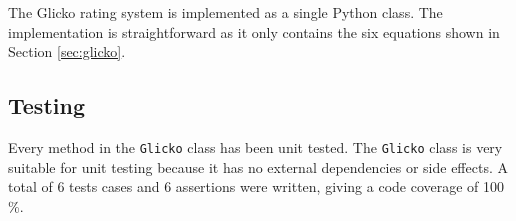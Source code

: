 The Glicko rating system is implemented as a single Python class.
The implementation is straightforward as it only contains the six equations shown in Section \ref{sec:glicko}.

\subsection{Testing}
Every method in the \texttt{Glicko} class has been unit tested.
The \texttt{Glicko} class is very suitable for unit testing because it has no external dependencies or side effects.
A total of 6 tests cases and 6 assertions were written, giving a code coverage of 100 \%.
